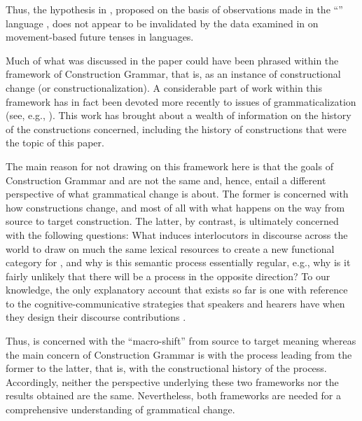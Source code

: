 \documentclass[output=paper]{langsci/langscibook}
\begin{document}
  Thus, the hypothesis in , proposed on the basis of observations made in the ``'' language , does not appear to be invalidated by the data examined in  on movement-based future tenses in  languages. 



  Much of what was discussed in the paper could have been phrased within the framework of Construction Grammar, that is, as an instance of constructional change (or constructionalization). A considerable part of work within this framework has in fact been devoted more recently to issues of grammaticalization (see, e.g., \citealt{Traugott2003,Noël2007,Trousdale2008,Hilpert2008,Hilpert2013,Hilpert2015,Bisang2010,DeSmet2010,GisbornePatten2011,VanBogaert2011,Trousdale2013,Hüning2014,TraugottTrousdale2014}). This work has brought about a wealth of information on the history of the constructions concerned, including the history of constructions that were the topic of this paper. 



  The main reason for not drawing on this framework here is that the goals of Construction Grammar and  are not the same and, hence, entail a different perspective of what grammatical change is about. The former is concerned with how constructions change, and most of all with what happens on the way from source to target construction. The latter, by contrast, is ultimately concerned with the following questions: What induces interlocutors in discourse across the world to draw on much the same lexical resources to create a new functional category for , and why is this semantic process essentially regular, e.g., why is it fairly unlikely that there will be a process in the opposite direction? To our knowledge, the only explanatory account that exists so far is one with reference to the cognitive-communicative strategies that speakers and hearers have when they design their discourse contributions \citep{HeineEtAl1991}.


\newpage
  Thus,  is concerned with the ``macro-shift'' from source to target meaning whereas the main concern of Construction Grammar is with the process leading from the former to the latter, that is, with the constructional history of the process. Accordingly, neither the perspective underlying these two frameworks nor the results obtained are the same. Nevertheless, both frameworks are needed for a comprehensive understanding of grammatical change. 
\end{document}
